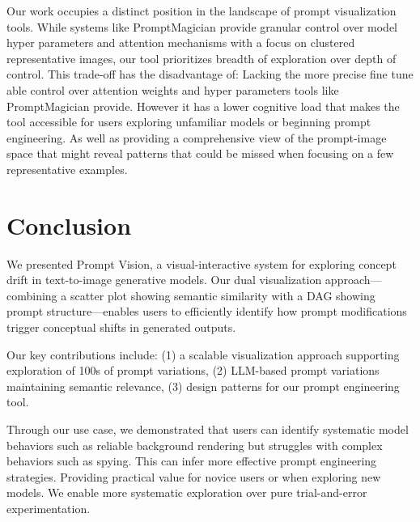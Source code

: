 \documentclass[
  a4paper,  %
  twoside,  %
  bibliography=totoc,
  headsepline,
  cleardoublepage=empty,
  parskip=half,
  draft=false
]{scrbook}
\begin{document}
Our work occupies a distinct position in the landscape of prompt visualization tools. While systems like PromptMagician \cite{PromptMagician} provide granular control over model hyper parameters and attention mechanisms with a focus on clustered representative images, our tool prioritizes breadth of exploration over depth of control. 
This trade-off has the disadvantage of: Lacking the more precise fine tune able control over attention weights and hyper parameters tools like PromptMagician provide. However it has a lower cognitive load that makes the tool accessible for users exploring unfamiliar models or beginning prompt engineering. As well as providing a comprehensive view of the prompt-image space that might reveal patterns that could be missed when focusing on a few representative examples.




















\chapter{Conclusion}




We presented Prompt Vision, a visual-interactive system for exploring concept drift in text-to-image generative models. Our dual visualization approach—combining a scatter plot showing semantic similarity with a DAG showing prompt structure—enables users to efficiently identify how prompt modifications trigger conceptual shifts in generated outputs.

Our key contributions include: (1) a scalable visualization approach supporting exploration of 100s of prompt variations, (2) LLM-based prompt variations maintaining semantic relevance, (3) design patterns for our prompt engineering tool.

Through our use case, we demonstrated that users can identify systematic model behaviors such as reliable background rendering but struggles with complex behaviors such as spying. This can infer more effective prompt engineering strategies. Providing practical value for novice users or when exploring new models. We enable more systematic exploration over pure trial-and-error experimentation.
\end{document}
